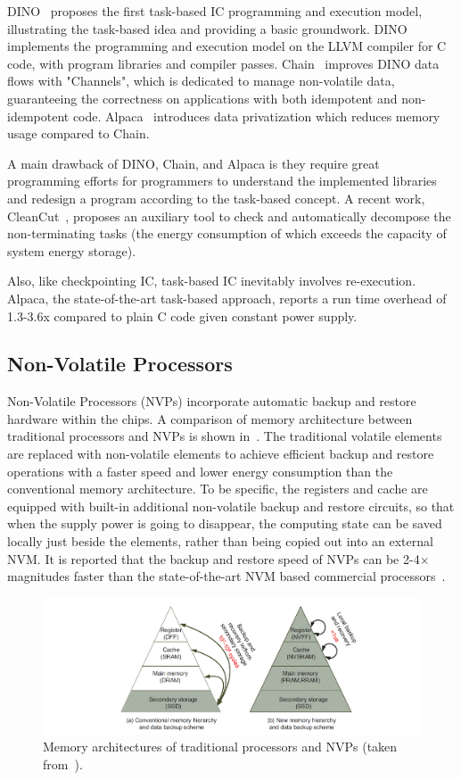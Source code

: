 DINO~\cite{lucia2015simpler} proposes the first task-based IC programming and execution model, illustrating the task-based idea and providing a basic groundwork. DINO implements the programming and execution model on the LLVM compiler for C code, with program libraries and compiler passes. Chain~\cite{colin2016chain} improves DINO data flows with "Channels", which is dedicated to manage non-volatile data, guaranteeing the correctness on applications with both idempotent and non-idempotent code. Alpaca~\cite{maeng2017alpaca} introduces data privatization which reduces memory usage compared to Chain.

A main drawback of DINO, Chain, and Alpaca is they require great programming efforts for programmers to understand the implemented libraries and redesign a program according to the task-based concept. A recent work, CleanCut~\cite{colin2018termination}, proposes an auxiliary tool to check and automatically decompose the non-terminating tasks (the energy consumption of which exceeds the capacity of system energy storage). 

Also, like checkpointing IC, task-based IC inevitably involves re-execution. Alpaca, the state-of-the-art task-based approach, reports a run time overhead of 1.3-3.6x compared to plain C code given constant power supply. 

\subsection{Non-Volatile Processors}

Non-Volatile Processors (NVPs) incorporate automatic backup and restore hardware within the chips. A comparison of memory architecture between traditional processors and NVPs is shown in~. The traditional volatile elements are replaced with non-volatile elements to achieve efficient backup and restore operations with a faster speed and lower energy consumption than the conventional memory architecture. To be specific, the registers and cache are equipped with built-in additional non-volatile backup and restore circuits, so that when the supply power is going to disappear, the computing state can be saved locally just beside the elements, rather than being copied out into an external NVM. It is reported that the backup and restore speed of NVPs can be 2-4$\times$ magnitudes faster than the state-of-the-art NVM based commercial processors~\cite{liu2015ambient}. 

\begin{figure}
    \centering
    \includegraphics[width=\columnwidth]{ch2_review/figures/nvp}
    \caption{Memory architectures of traditional processors and NVPs (taken from~\cite{liu2015ambient}).}
    \label{Figure:nvp}
\end{figure}

